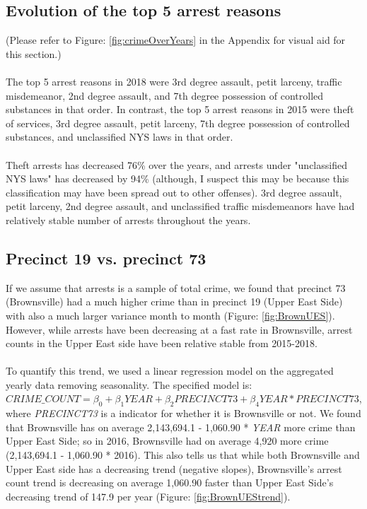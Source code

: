 \documentclass[11pt]{article}\usepackage[]{graphicx}\usepackage[]{color}
\begin{document}
\subsection{Evolution of the top 5 arrest reasons}
(Please refer to Figure: \ref{fig:crimeOverYears} in the Appendix for visual aid for this section.)
\\\\
The top 5 arrest reasons in 2018 were 3rd degree assault, petit larceny, traffic misdemeanor, 2nd degree assault, and 7th degree possession of controlled substances in that order. In contrast, the top 5 arrest reasons in 2015 were theft of services, 3rd degree assault, petit larceny, 7th degree possession of controlled substances, and unclassified NYS laws in that order.
\\\\
Theft arrests has decreased 76\% over the years, and arrests under "unclassified NYS laws" has decreased by 94\% (although, I suspect this may be because this classification may have been spread out to other offenses). 3rd degree assault, petit larceny, 2nd degree assault, and unclassified traffic misdemeanors have had relatively stable number of arrests throughout the years. 

\subsection{Precinct 19 vs. precinct 73}
If we assume that arrests is a sample of total crime, we found that precinct 73 (Brownsville) had a much higher crime than in precinct 19 (Upper East Side) with also a much larger variance month to month (Figure: \ref{fig:BrownUES}). However, while arrests have been decreasing at a fast rate in Brownsville, arrest counts in the Upper East side have been relative stable from 2015-2018. 
\\\\
To quantify this trend, we used a linear regression model on the aggregated yearly data removing seasonality. The specified model is: $CRIME\_COUNT = \beta_0 + \beta_1YEAR + \beta_2PRECINCT73 +\beta_4YEAR*PRECINCT73$, where \textit{PRECINCT73} is a indicator for whether it is Brownsville or not. We found that Brownsville has on average 2,143,694.1 - 1,060.90 * \textit{YEAR} more crime than Upper East Side; so in 2016, Brownsville had on average 4,920 more crime (2,143,694.1 - 1,060.90 * 2016). This also tells us that while both Brownsville and Upper East side has a decreasing trend (negative slopes), Brownsville's arrest count trend is decreasing on average 1,060.90 faster than Upper East Side's decreasing trend of 147.9 per year (Figure: \ref{fig:BrownUEStrend}).
\end{document}
